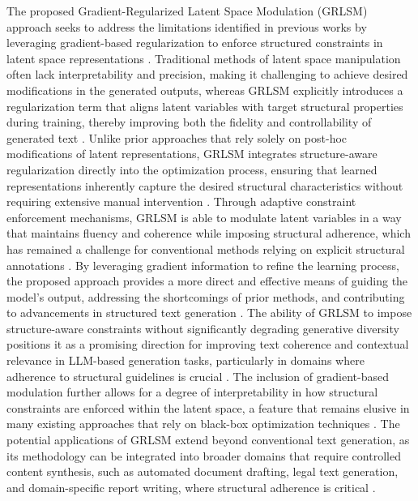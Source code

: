 The proposed Gradient-Regularized Latent Space Modulation (GRLSM) approach seeks to address the limitations identified in previous works by leveraging gradient-based regularization to enforce structured constraints in latent space representations \cite{linwood2024optimizing}. Traditional methods of latent space manipulation often lack interpretability and precision, making it challenging to achieve desired modifications in the generated outputs, whereas GRLSM explicitly introduces a regularization term that aligns latent variables with target structural properties during training, thereby improving both the fidelity and controllability of generated text \cite{ogof2024enhancing}. Unlike prior approaches that rely solely on post-hoc modifications of latent representations, GRLSM integrates structure-aware regularization directly into the optimization process, ensuring that learned representations inherently capture the desired structural characteristics without requiring extensive manual intervention \cite{kirchenbauer2024hallucination}. Through adaptive constraint enforcement mechanisms, GRLSM is able to modulate latent variables in a way that maintains fluency and coherence while imposing structural adherence, which has remained a challenge for conventional methods relying on explicit structural annotations \cite{wong2024efficiency}. By leveraging gradient information to refine the learning process, the proposed approach provides a more direct and effective means of guiding the model’s output, addressing the shortcomings of prior methods, and contributing to advancements in structured text generation \cite{cabeleireiro2024dynamic, pedicir2024novel}. The ability of GRLSM to impose structure-aware constraints without significantly degrading generative diversity positions it as a promising direction for improving text coherence and contextual relevance in LLM-based generation tasks, particularly in domains where adherence to structural guidelines is crucial \cite{kanax2024contextualized}. The inclusion of gradient-based modulation further allows for a degree of interpretability in how structural constraints are enforced within the latent space, a feature that remains elusive in many existing approaches that rely on black-box optimization techniques \cite{mou2024contextual,yilar2024recursive}. The potential applications of GRLSM extend beyond conventional text generation, as its methodology can be integrated into broader domains that require controlled content synthesis, such as automated document drafting, legal text generation, and domain-specific report writing, where structural adherence is critical \cite{ zablocki2024assessing}.